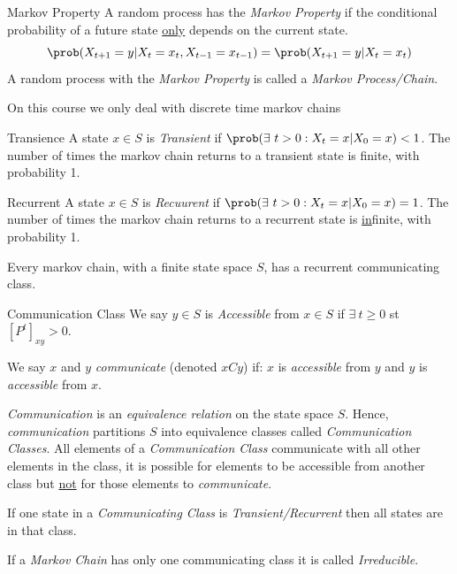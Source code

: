 \documentclass[11pt,a4paper]{article}
\begin{document}
\begin{definition}{Markov Property}
  A random process has the \textit{Markov Property} if the conditional probability of a future state \underline{only} depends on the current state.
  \[ \prob(X_{t+1}=y|X_{t}=x_t,X_{t-1}=x_{t-1})=\prob(X_{t+1}=y|X_t=x_t) \]
  A random process with the \textit{Markov Property} is called a \textit{Markov Process/Chain}.
\end{definition}

\begin{remark}{On this course we only deal with discrete time markov chains}

\end{remark}

\begin{definition}{Transience}
  A state $x\in S$ is \textit{Transient} if $\prob(\exists\ t>0: X_t=x|X_0=x)<1$. The number of times the markov chain returns to a transient state is finite, with probability 1.
\end{definition}

\begin{definition}{Recurrent}
  A state $x\in S$ is \textit{Recuurent} if $\prob(\exists\ t>0: X_t=x|X_0=x)=1$. The number of times the markov chain returns to a recurrent state is \underline{in}finite, with probability 1.
  \par Every markov chain, with a finite state space $S$, has a recurrent communicating class.
\end{definition}

\begin{definition}{Communication Class}
  We say $y\in S$ is \textit{Accessible} from $x\in S$ if $\exists\ t\geq0$ st $[P^t]_{xy}>0$.
  \par We say $x$ and $y$ \textit{communicate} (denoted $xCy$) if: $x$ is \textit{accessible} from $y$ and $y$ is \textit{accessible} from $x$.
  \par \textit{Communication} is an \textit{equivalence relation} on the state space $S$. Hence, \textit{communication} partitions $S$ into equivalence classes called \textit{Communication Classes}. All elements of a \textit{Communication Class} communicate with all other elements in the class, it is possible for elements to be accessible from another class but \underline{not} for those elements to \textit{communicate}.
  \par If one state in a \textit{Communicating Class} is \textit{Transient/Recurrent} then all states are in that class.
  \par If a \textit{Markov Chain} has only one communicating class it is called \textit{Irreducible}.
\end{definition}
\end{document}
